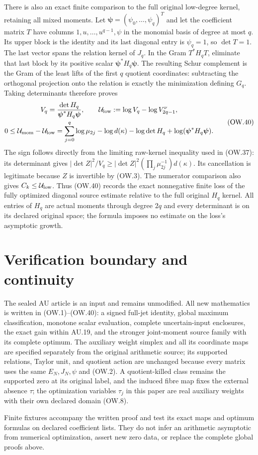 \documentclass[11pt]{article}
\begin{document}
There is also an exact finite comparison to the full original low-degree
kernel, retaining all mixed moments. Let
$\boldsymbol\psi=(\psi_0,\ldots,\psi_q)^T$ and let the coefficient
matrix $T$ have columns $1,u,\ldots,u^{q-1},\psi$ in the monomial
basis of degree at most $q$. Its upper block is the identity and its
last diagonal entry is $\psi_q=1$, so $\det T=1$. The last vector
spans the relation kernel of $J_q$. In the Gram $T^*H_qT$, eliminate
that last block by its positive scalar
$\boldsymbol\psi^*H_q\boldsymbol\psi$. The resulting Schur complement
is the Gram of the least lifts of the first $q$ quotient coordinates:
subtracting the orthogonal projection onto the relation is exactly
the minimization defining $G_q$. Taking determinants therefore proves
\[
 \begin{gathered}
 V_q=\frac{\det H_q}{\boldsymbol\psi^*H_q\boldsymbol\psi},\qquad
 \mathcal U_{\rm low}:=\log V_q-\log V_{2q-1}^\nu,\\
 0\le\mathcal U_{\rm mom}-\mathcal U_{\rm low}
  =\sum_{j=0}^q\log\mu_{2j}-\log d(\kappa)-\log\det H_q
             +\log(\boldsymbol\psi^*H_q\boldsymbol\psi).
 \end{gathered}                                                \tag{OW.40}
\]
The sign follows directly from the limiting raw-kernel inequality used
in (OW.37): its determinant gives
$|\det Z|^2/V_q\ge|\det Z|^2
(\prod_j\mu_{2j}^{-1})d(\kappa)$.
Its cancellation is legitimate because $Z$ is invertible by (OW.3).
The numerator comparison also gives $C_k\le\mathcal U_{\rm low}$.
Thus (OW.40) records the exact nonnegative finite loss of the fully
optimized diagonal source estimate relative to the full original
$H_q$ kernel. All entries of $H_q$ are actual moments through degree
$2q$ and every determinant is on its declared original space; the
formula imposes no estimate on the loss's asymptotic growth.

\section{Verification boundary and continuity}

The sealed AU article is an input and remains unmodified. All new
mathematics is written in (OW.1)--(OW.40): a signed full-jet identity,
global maximum classification, monotone scalar evaluation, complete
uncertain-input enclosures, the exact gain within AU.19, and the stronger
joint-moment source family with its complete optimum. The auxiliary
weight simplex and all its coordinate maps are specified separately
from the original arithmetic source; its supported relations, Taylor
unit, and quotient action are unchanged because every matrix uses
the same $E_N,J_N,\psi$ and (OW.2). A quotient-killed class remains
the supported zero at its original label, and the induced fibre map
fixes the external absence $\tau$; the optimization variables
$\tau_j$ in this paper are real auxiliary weights with their own
declared domain (OW.8).

Finite fixtures accompany the written proof and test its exact maps
and optimum formulas on declared coefficient lists. They do not
infer an arithmetic asymptotic from numerical optimization, assert
new zero data, or replace the complete global proofs above.
\end{document}
